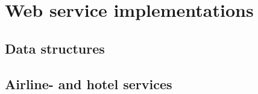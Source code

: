 {\setlength{\chapterfontsize}{23pt}
\chapter{Web service implementations}
}

\section{Data structures}

\section{Airline- and hotel services}
